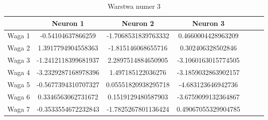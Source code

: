 \documentclass{classrep}
\begin{document}
{        \begin{table}[!htbp]
            \centering
            \begin{tabular}{|c|c|c|c|c|c|l|}
            \hline
                    & Neuron 1      & Neuron 2      & Neuron 3        \\ \hline
            Waga 1 & -0.54104637866259              &  -1.7068531839763332             & 0.4660004428963209                \\ \hline
            Waga 2 & 1.3917794904558363              & -1.815146068655716              & 0.302406328502846                \\ \hline
            Waga 3 & -1.2412118399681937              & 2.2897514884650905              & -3.1060163015774505                \\ \hline
            Waga 4 & -3.2329287168978396              & 1.497185122036276              & -3.1859032863902157                \\ \hline
            Waga 5 & -0.5677394310707327              & 0.05551820938295718              & -4.683123646942736                \\ \hline
            Waga 6 & 0.3346563062731672              &  0.1519129480587903             &  -3.6759099132364867               \\ \hline
            Waga 7 & -0.3533554672232843              & -1.7825267801136424              & 0.49067055329904785                \\ \hline

            \end{tabular}
            \caption{Warstwa numer 3}
            \end{table}
        \FloatBarrier


}
\end{document}
